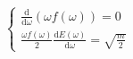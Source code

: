 $$\begin{cases}\frac{\mathrm{d}}{\mathrm{d}\omega}\left(\omega f\left(\omega\right)\right)=0 \\ \frac{\omega f\left(\omega\right)}{2}\frac{\mathrm{d}E\left(\omega\right)}{\mathrm{d}\omega}=\sqrt{\frac{m}{2}} \end{cases}$$

